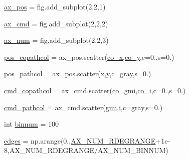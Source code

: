 \begin{DoxyCompactItemize}
\hyperlink{namespaceplot__Draco__SDSS__CMD__CMcut_ad410368b011d45e4823aaf609922415c}{ax\+\_\+pos} = fig.\+add\+\_\+subplot(2,2,1)
\item 
\hyperlink{namespaceplot__Draco__SDSS__CMD__CMcut_a6024e35ea81cf9c711059ad7e67f6823}{ax\+\_\+cmd} = fig.\+add\+\_\+subplot(2,2,2)
\item 
\hyperlink{namespaceplot__Draco__SDSS__CMD__CMcut_a8ffec3e03ebe5d27c598231b11ac69b0}{ax\+\_\+num} = fig.\+add\+\_\+subplot(2,2,3)
\item 
\hyperlink{namespaceplot__Draco__SDSS__CMD__CMcut_ac1f9327a715f9b40f6f705b226bf6d4e}{pos\+\_\+copathcol} = ax\+\_\+pos.\+scatter(\hyperlink{namespaceplot__Draco__SDSS__CMD__CMcut_a4263c5309afa7bc424d494a8f68d69f7}{co\+\_\+x},\hyperlink{namespaceplot__Draco__SDSS__CMD__CMcut_a65f19aa6538c710b3afe5b0fe1c4d5df}{co\+\_\+y},c=\textquotesingle{}0.\textquotesingle{},s=0.)
\item 
\hyperlink{namespaceplot__Draco__SDSS__CMD__CMcut_a383932c8693f340c6e0befa8ceec8d1c}{pos\+\_\+pathcol} = ax\+\_\+pos.\+scatter(\hyperlink{namespaceplot__Draco__SDSS__CMD__CMcut_a67531d4792e3019b4dc270001b538121}{x},\hyperlink{namespaceplot__Draco__SDSS__CMD__CMcut_ad2004cd6fb4127cd926a8619e568255b}{y},c=\textquotesingle{}gray\textquotesingle{},s=0.)
\item 
\hyperlink{namespaceplot__Draco__SDSS__CMD__CMcut_a7d387739060bb462041d2ec5390a742d}{cmd\+\_\+copathcol} = ax\+\_\+cmd.\+scatter(\hyperlink{namespaceplot__Draco__SDSS__CMD__CMcut_a05465129dacea1fc4a6fedad4b0f0029}{co\+\_\+gmi},\hyperlink{namespaceplot__Draco__SDSS__CMD__CMcut_a39d8d2ada3a2e98c5985f134fe54c6ec}{co\+\_\+i},c=\textquotesingle{}0.\textquotesingle{},s=0.)
\item 
\hyperlink{namespaceplot__Draco__SDSS__CMD__CMcut_aa97847513608fe9d0ea4a87c53872c20}{cmd\+\_\+pathcol} = ax\+\_\+cmd.\+scatter(\hyperlink{namespaceplot__Draco__SDSS__CMD__CMcut_a17ecc3c497056424be4f2c1d0fa8a178}{gmi},\hyperlink{namespaceplot__Draco__SDSS__CMD__CMcut_a6d4ac228accda712923ca1b9740c0407}{i},c=\textquotesingle{}gray\textquotesingle{},s=0.)
\item 
int \hyperlink{namespaceplot__Draco__SDSS__CMD__CMcut_a18d6de36e98130ab16c708346576b80f}{binnum} = 100
\item 
\hyperlink{namespaceplot__Draco__SDSS__CMD__CMcut_a70e4e337d90cea561909f4aba7cd8af2}{edges} = np.\+arange(0.,\hyperlink{namespaceplot__Draco__SDSS__CMD__CMcut_a0b36091b75b5333bcb2c2b33b515d6e9}{A\+X\+\_\+\+N\+U\+M\+\_\+\+R\+D\+E\+G\+R\+A\+N\+GE}+1e-\/8,\+A\+X\+\_\+\+N\+U\+M\+\_\+\+R\+D\+E\+G\+R\+A\+N\+G\+E/\+A\+X\+\_\+\+N\+U\+M\+\_\+\+B\+I\+N\+N\+U\+M)

\end{DoxyCompactItemize}
